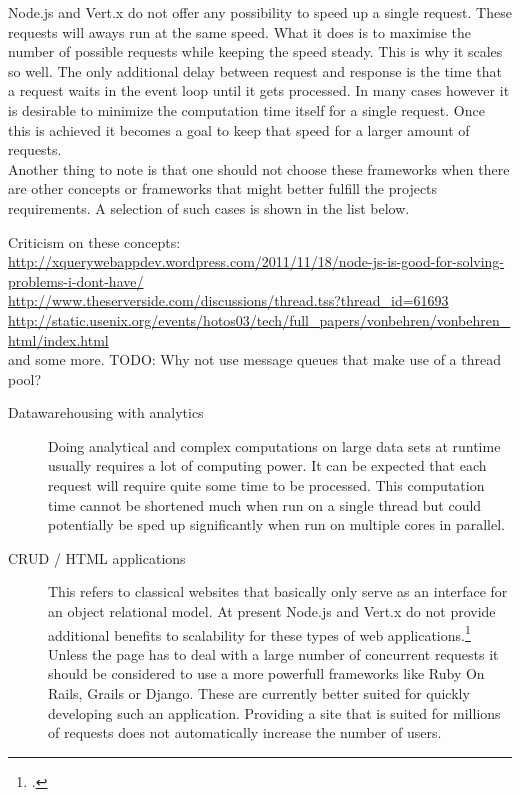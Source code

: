 Node.js and Vert.x do not offer any possibility to speed up a single request. These requests will aways
run at the same speed. What it does is to maximise the number of possible requests while keeping the speed
steady. This is why it scales so well. The only additional delay between request and response is the time
that a request waits in the event loop until it gets processed.  In many cases however it is desirable to minimize the computation time itself for a single request. Once this is achieved it becomes a goal to keep that speed for a larger amount of requests.\\

Another thing to note is that one should not choose these frameworks when
there are other concepts or frameworks that might better fulfill the 
projects requirements.
A selection of such cases is shown in the list below. 

Criticism on these concepts:\\
\url{http://xquerywebappdev.wordpress.com/2011/11/18/node-js-is-good-for-solving-problems-i-dont-have/}\\
\url{http://www.theserverside.com/discussions/thread.tss?thread_id=61693}\\
\url{http://static.usenix.org/events/hotos03/tech/full_papers/vonbehren/vonbehren_html/index.html}\\
and some more. TODO: Why not use message queues that make use of a thread pool?


\begin{description}
  \item[Datawarehousing with analytics] Doing analytical and complex computations
  	on large data sets at runtime usually requires a lot of computing power.
  	It can be expected that each request will require quite some time to be processed.
  	This computation time cannot be shortened much when run on a single thread but 
  	could potentially be sped up significantly when run on multiple cores in parallel. 
  \item[CRUD / HTML applications] 
	This refers to classical websites that basically only serve as an interface for
	an object relational model.
	At present Node.js and Vert.x do not provide additional benefits to scalability
	for these types of web applications.\footcite[Cf.][15]{Roden_2012} Unless the page has to deal with a large number of
	concurrent requests it should be considered to use a more powerfull frameworks
	like Ruby On Rails, Grails or Django. These are currently better suited for quickly
	developing such an application. Providing a site that is suited for 
	millions of requests does not automatically increase the number of users.
\end{description}
    

